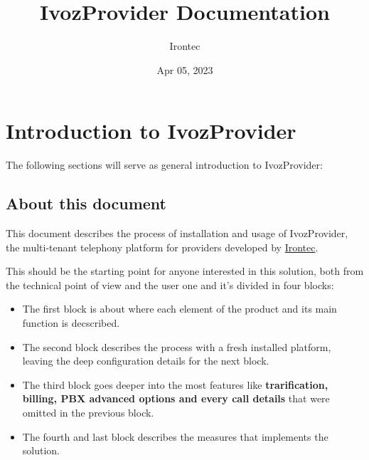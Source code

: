 \documentclass[letterpaper,10pt,english]{sphinxmanual}
\title{IvozProvider Documentation}
\date{Apr 05, 2023}
\author{Irontec}
\begin{document}
\maketitle
\tableofcontents
{}\label{index::doc}



\chapter{Introduction to IvozProvider}
\label{intro/index::doc}\label{intro/index:introduction-to-ivozprovider}\label{intro/index:ivozprovider-official-documentation}
The following sections will serve as general introduction to IvozProvider:


\section{About this document}
\label{intro/about:about-this-document}\label{intro/about::doc}
This document describes the process of installation and usage of
IvozProvider, the multi-tenant telephony platform for providers developed
by \href{http://irontec.com}{Irontec}.

This should be the starting point for anyone interested in this solution,
both  from the technical point of view and the user one and it's divided
in four blocks:
\begin{itemize}
\item {} 
The first block is about {\hyperref[index:concepts]{}} where each element of the
product and its main function is decscribed.

\item {} 
The second block describes the {\hyperref[index:installation]{}} process with a fresh
installed platform, leaving the deep configuration details for the next
block.

\item {} 
The third block goes deeper into the most {\hyperref[index:advanced]{}} features like
\textbf{trarification, billing, PBX advanced options and every call details}
that were omitted in the previous block.

\item {} 
The fourth and last block describes the {\hyperref[index:security]{}} measures that
implements the solution.

\end{itemize}
\end{document}
